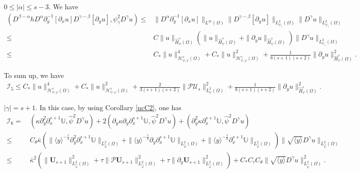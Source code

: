 \documentclass{amsart}
\numberwithin{equation}{section}
\newcommand\y{{{\langle y \rangle}}}
\begin{document}
 $0\leq|\alpha|\leq s-3$. We have
\begin{align*}
(D^{\beta-\alpha}hD^{\alpha}\partial_{y}^{-1}[\partial_{x}u]D^{\gamma-\beta}[\partial_{y}u],\psi_{\gamma}^{2}D^{\gamma}u)
\leq& \|D^{\alpha}\partial_{y}^{-1}[\partial_{x}u]\|_{L^{\infty}(\Omega)}
      \|D^{\gamma-\beta}[\partial_{y}u]\|_{L_{\psi_{\gamma}}^{2}(\Omega)}
      \|D^{\gamma}u\|_{L_{\psi_{\gamma}}^{2}(\Omega)}\\
\leq& C\|u\|_{\hat{H}_{\psi}^{s}(\Omega)}
       \left(\|u\|_{\hat{H}_{\psi}^{s}(\Omega)}+\|\partial_{y}u\|_{\hat{H}_{\psi}^{s}(\Omega)}\right)
       \|D^{\gamma}u\|_{L_{\psi_{\gamma}}^{2}(\Omega)}\\
\leq& C_{*}\|u\|_{\mathcal{H}_{\psi,\varphi}^{s}(\Omega)}^{4}
     +C_{*}\|u\|_{\mathcal{H}_{\psi,\varphi}^{s}(\Omega)}^{2}
     +\frac{1}{8(s+1)(s+2)}\|\partial_{y}u\|_{\hat{H}_{\psi}^{s}(\Omega)}^{2}.
\end{align*}

To sum up, we have
\begin{align*}
\mathcal{I}_{5}
\leq C_{*}\|u\|_{\mathcal{H}_{\psi,\varphi}^{s}(\Omega)}^{4}
     +C_{*}\|u\|_{\mathcal{H}_{\psi,\varphi}^{s}(\Omega)}^{2}
     +\frac{2}{3(s+1)(s+2)}\|\mathcal{P}\mathcal{U}_{s}\|_{L_{\varphi}^{2}(\Omega)}^{2}
     +\frac{1}{8(s+1)(s+2)}\|\partial_{y}u\|_{\hat{H}_{\psi}^{s}(\Omega)}^{2}.
\end{align*}


 $|\gamma|=s+1$.
In this case, by using Corollary \ref{ncC2}, one has
\begin{align}\label{I6c1}
\mathcal{I}_{6}
=&~(\kappa\partial_{y}^{2}\partial_{x}^{s+1}\mathbb{U},\hat{\psi}^{2}D^{\gamma}u)
  +2(\partial_{y}\kappa\partial_{y}\partial_{x}^{s+1}\mathbb{U},\hat{\psi}^{2}D^{\gamma}u)
  +(\partial_{y}^{2}\kappa\partial_{x}^{s+1}\mathbb{U},\hat{\psi}^{2}D^{\gamma}u)\\
\leq&~C_{\theta}\bar{\kappa}\left(\|\y^{-\frac{1}{2}}\partial_{y}^{2}\partial_{x}^{s+1}\mathbb{U}\|_{L_{\hat{\psi}}^{2}(\Omega)}
                        +\|\y^{-\frac{1}{2}}\partial_{y}\partial_{x}^{s+1}\mathbb{U}\|_{L_{\hat{\psi}}^{2}(\Omega)}
                        +\|\y^{-\frac{1}{2}}\partial_{x}^{s+1}\mathbb{U}\|_{L_{\hat{\psi}}^{2}(\Omega)}\right)
                  \|\sqrt{\y}D^{\gamma}u\|_{L_{\hat{\psi}}^{2}(\Omega)}\nonumber\\
\leq&~\bar{\kappa}^{2}\left(\|\mathbf{U}_{s+1}\|_{L_{\hat{\varphi}}^{2}(\Omega)}^{2}
                     +\tau\|\mathcal{P}\mathbf{U}_{s+1}\|_{L_{\hat{\varphi}}^{2}(\Omega)}^{2}
                     +\tau\|\partial_{y}\mathbf{U}_{s+1}\|_{L_{\hat{\varphi}}^{2}(\Omega)}^{2}\right)
     +C_{*}C_{\tau}C_{\theta}\|\sqrt{\y}D^{\gamma}u\|_{L_{\hat{\psi}}^{2}(\Omega)}^{2}.\nonumber
\end{align}
\end{document}
